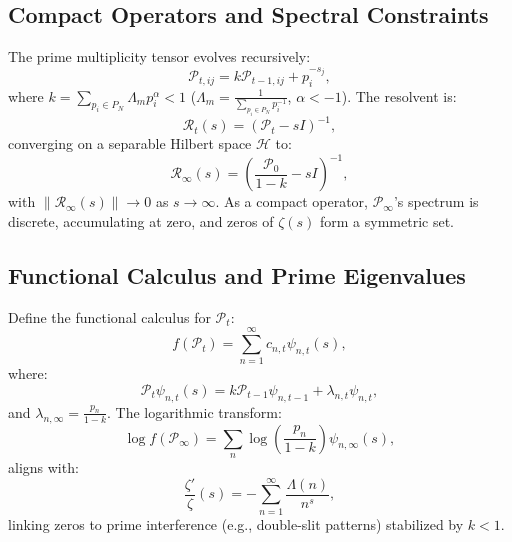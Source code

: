 \documentclass[11pt]{article}
\theoremstyle{plain}
\begin{document}
\subsection{Compact Operators and Spectral Constraints}
The prime multiplicity tensor evolves recursively:
\begin{equation}
    \mathcal{P}_{t,ij} = k \mathcal{P}_{t-1,ij} + p_i^{-s_j},
\end{equation}
where \( k = \sum_{p_i \in P_N} \Lambda_m p_i^\alpha < 1 \) (\( \Lambda_m = \frac{1}{\sum_{p_i \in P_N} p_i^{-1}} \), \( \alpha < -1 \)). The resolvent is:
\begin{equation}
    \mathcal{R}_t(s) = (\mathcal{P}_t - s I)^{-1},
\end{equation}
converging on a separable Hilbert space \( \mathscr{H} \) to:
\begin{equation}
    \mathcal{R}_\infty(s) = \left( \frac{\mathcal{P}_0}{1 - k} - s I \right)^{-1},
\end{equation}
with \( \|\mathcal{R}_\infty(s)\| \to 0 \) as \( s \to \infty \). As a compact operator, \( \mathcal{P}_\infty \)’s spectrum is discrete, accumulating at zero, and zeros of \( \zeta(s) \) form a symmetric set.

\subsection{Functional Calculus and Prime Eigenvalues}
Define the functional calculus for \( \mathcal{P}_t \):
\begin{equation}
    f(\mathcal{P}_t) = \sum_{n=1}^{\infty} c_{n,t} \psi_{n,t}(s),
\end{equation}
where:
\begin{equation}
    \mathcal{P}_t \psi_{n,t}(s) = k \mathcal{P}_{t-1} \psi_{n,t-1} + \lambda_{n,t} \psi_{n,t},
\end{equation}
and \( \lambda_{n,\infty} = \frac{p_n}{1 - k} \). The logarithmic transform:
\begin{equation}
    \log f(\mathcal{P}_\infty) = \sum_{n} \log\left(\frac{p_n}{1 - k}\right) \psi_{n,\infty}(s),
\end{equation}
aligns with:
\begin{equation}
    \frac{\zeta'}{\zeta}(s) = -\sum_{n=1}^{\infty} \frac{\Lambda(n)}{n^s},
\end{equation}
linking zeros to prime interference (e.g., double-slit patterns) stabilized by \( k < 1 \).
\end{document}
